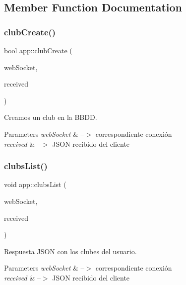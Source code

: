 \subsection{Member Function Documentation}
\mbox{\label{classapp_afb7363d3bc58746f8c71425ba6050db1}} 
\subsubsection{\texorpdfstring{club\+Create()}{clubCreate()}}
{\footnotesize\ttfamily bool app\+::club\+Create (\begin{DoxyParamCaption}\item[{ix\+::\+Web\+Socket $\ast$}]{web\+Socket,  }\item[{J\+S\+ON}]{received }\end{DoxyParamCaption})}



Creamos un club en la B\+B\+DD. 


\begin{DoxyParams}{Parameters}
{\em web\+Socket} & --$>$ correspondiente conexión \\
\hline
{\em received} & --$>$ J\+S\+ON recibido del cliente \\
\hline
\end{DoxyParams}
\mbox{\label{classapp_aacb1fe686708ce187073676232491baf}} 
\subsubsection{\texorpdfstring{clubs\+List()}{clubsList()}}
{\footnotesize\ttfamily void app\+::clubs\+List (\begin{DoxyParamCaption}\item[{ix\+::\+Web\+Socket $\ast$}]{web\+Socket,  }\item[{J\+S\+ON}]{received }\end{DoxyParamCaption})}



Respuesta J\+S\+ON con los clubes del usuario. 


\begin{DoxyParams}{Parameters}
{\em web\+Socket} & --$>$ correspondiente conexión \\
\hline
{\em received} & --$>$ J\+S\+ON recibido del cliente \\
\hline
\end{DoxyParams}
\mbox{\label{classapp_a42e2a44d3325daf63b3ec57b8921d1b5}} 
